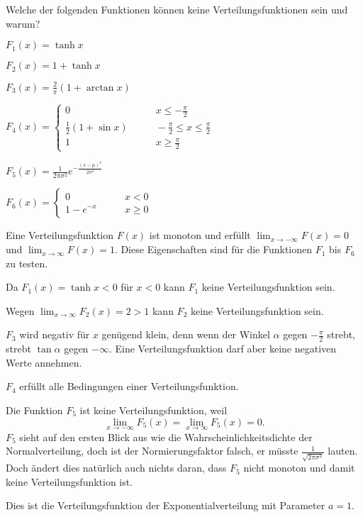 Welche der folgenden Funktionen können keine Verteilungsfunktionen sein
und warum?
\begin{teilaufgaben}
\item $F_1(x)=\tanh x$
\item $F_2(x)=1+\tanh x$
\item $F_3(x)=\frac2{\pi}(1+\arctan x)$
\item $F_4(x)=\begin{cases}
0&\qquad x\le -\frac{\pi}2\\
\frac12(1+\sin x)&\qquad-\frac{\pi}2\le x\le \frac{\pi}2\\
1&\qquad x\ge \frac{\pi}2
\end{cases}$
\item $F_5(x)=\frac1{2\pi\sigma^2}e^{-\frac{(x-\mu)^2}{2\sigma^2}}$
\item $F_6(x)=\begin{cases}0&\qquad x<0\\1-e^{-x}&\qquad x\ge 0\end{cases}$
\end{teilaufgaben}

\begin{loesung}
Eine Verteilungsfunktion $F(x)$ ist monoton und erfüllt
$\lim_{x\to-\infty}F(x)=0$
und
$\lim_{x\to\infty}F(x)=1$. Diese Eigenschaften sind für die
Funktionen $F_1$ bis $F_6$ zu testen.
\begin{teilaufgaben}
\item Da $F_1(x)=\tanh x<0$ für $x<0$ kann $F_1$ keine Verteilungsfunktion sein.
\item Wegen $\lim_{x\to\infty}F_2(x)=2>1$ kann $F_2$ keine Verteilungsfunktion sein.
\item $F_3$ wird negativ für $x$ genügend klein, denn wenn der Winkel
$\alpha$ gegen $-\frac{\pi}2$ strebt, strebt $\tan\alpha$ gegen $-\infty$.
Eine Verteilungsfunktion darf aber keine negativen Werte annehmen.
\item $F_4$ erfüllt alle Bedingungen einer Verteilungsfunktion.
\item Die Funktion $F_5$ ist keine Verteilungsfunktion, weil
\[
\lim_{x\to-\infty}F_5(x)=\lim_{x\to\infty}F_5(x)=0.
\]
$F_5$ sieht auf den ersten
Blick aus wie die Wahrscheinlichkeitsdichte der Normalverteilung, doch ist
der Normierungsfaktor falsch, er müsste $\frac1{\sqrt{2\pi\sigma^2}}$ lauten.
Doch ändert dies natürlich auch nichts daran, dass $F_5$ nicht monoton und damit
keine Verteilungsfunktion ist.
\item Dies ist die Verteilungsfunktion der Exponentialverteilung mit Parameter $a=1$.
\qedhere
\end{teilaufgaben}
\end{loesung}

